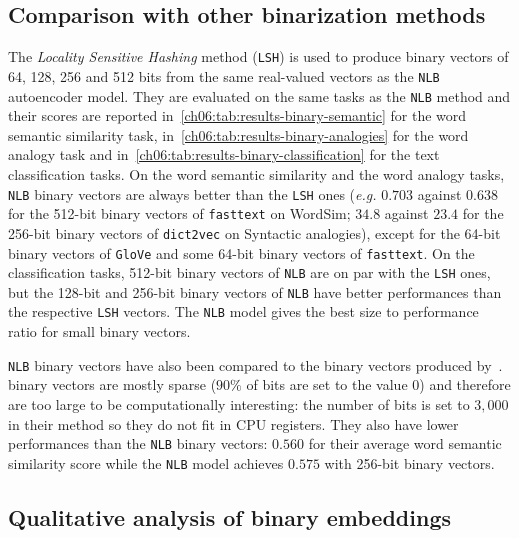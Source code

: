   \subsection{Comparison with other binarization methods}
    \label{ch06:subsec:performances-others}
    The \textit{Locality Sensitive Hashing} method (\texttt{LSH}) is used to
    produce binary vectors of 64, 128, 256 and 512 bits from the same
    real-valued vectors as the \texttt{NLB} autoencoder model. They are
    evaluated on the same tasks as the \texttt{NLB} method and their scores are
    reported in~\autoref{ch06:tab:results-binary-semantic} for the word semantic
    similarity task, in~\autoref{ch06:tab:results-binary-analogies} for the word
    analogy task and in~\autoref{ch06:tab:results-binary-classification} for the
    text classification tasks. On the word semantic similarity and the word
    analogy tasks, \texttt{NLB} binary vectors are always better than the
    \texttt{LSH} ones (\textit{e.g.} $0.703$ against $0.638$ for the 512-bit
    binary vectors of \texttt{fasttext} on WordSim; $34.8$ against $23.4$ for
    the 256-bit binary vectors of \texttt{dict2vec} on Syntactic analogies),
    except for the 64-bit binary vectors of \texttt{GloVe} and some 64-bit
    binary vectors of \texttt{fasttext}. On the classification tasks, 512-bit
    binary vectors of \texttt{NLB} are on par with the \texttt{LSH} ones, but
    the 128-bit and 256-bit binary vectors of \texttt{NLB} have better
    performances than the respective \texttt{LSH} vectors. The \texttt{NLB}
    model gives the best size to performance ratio for small binary vectors.
    \medskip

    \texttt{NLB} binary vectors have also been compared to the binary vectors
    produced by~\citep{faruqui2015sparse}.~\citeauthor{faruqui2015sparse} binary
    vectors are mostly sparse ($90\%$ of bits are set to the value $0$) and
    therefore are too large to be computationally interesting: the number of
    bits is set to $3,000$ in their method so they do not fit in CPU registers.
    They also have lower performances than the \texttt{NLB} binary vectors:
    $0.560$ for their average word semantic similarity score while the
    \texttt{NLB} model achieves $0.575$ with 256-bit binary vectors.

  \subsection{Qualitative analysis of binary embeddings}
    \label{ch06:subsec:qualitative-analysis}
